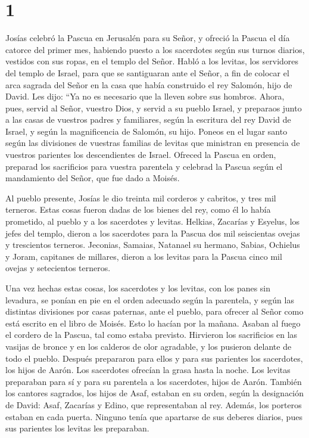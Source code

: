\hypertarget{section}{%
\section{1}\label{section}}

 Josías celebró la Pascua en Jerusalén para su Señor, y
ofreció la Pascua el día catorce del primer mes,  habiendo
puesto a los sacerdotes según sus turnos diarios, vestidos con sus
ropas, en el templo del Señor.  Habló a los levitas, los
servidores del templo de Israel, para que se santiguaran ante el Señor,
a fin de colocar el arca sagrada del Señor en la casa que había
construido el rey Salomón, hijo de David.  Les dijo: ``Ya
no es necesario que la lleven sobre sus hombros. Ahora, pues, servid al
Señor, vuestro Dios, y servid a su pueblo Israel, y preparaos junto a
las casas de vuestros padres y familiares,  según la
escritura del rey David de Israel, y según la magnificencia de Salomón,
su hijo. Poneos en el lugar santo según las divisiones de vuestras
familias de levitas que ministran en presencia de vuestros parientes los
descendientes de Israel.  Ofreced la Pascua en orden,
preparad los sacrificios para vuestra parentela y celebrad la Pascua
según el mandamiento del Señor, que fue dado a Moisés.

 Al pueblo presente, Josías le dio treinta mil corderos y
cabritos, y tres mil terneros. Estas cosas fueron dadas de los bienes
del rey, como él lo había prometido, al pueblo y a los sacerdotes y
levitas.  Helkias, Zacarías y Esyelus, los jefes del
templo, dieron a los sacerdotes para la Pascua dos mil seiscientas
ovejas y trescientos terneros.  Jeconias, Samaias,
Natanael su hermano, Sabias, Ochielus y Joram, capitanes de millares,
dieron a los levitas para la Pascua cinco mil ovejas y setecientos
terneros.

 Una vez hechas estas cosas, los sacerdotes y los
levitas, con los panes sin levadura, se ponían en pie en el orden
adecuado según la parentela,  y según las distintas
divisiones por casas paternas, ante el pueblo, para ofrecer al Señor
como está escrito en el libro de Moisés. Esto lo hacían por la mañana.
 Asaban al fuego el cordero de la Pascua, tal como estaba
previsto. Hirvieron los sacrificios en las vasijas de bronce y en los
calderos de olor agradable,  y los pusieron delante de
todo el pueblo. Después prepararon para ellos y para sus parientes los
sacerdotes, los hijos de Aarón.  Los sacerdotes ofrecían
la grasa hasta la noche. Los levitas preparaban para sí y para su
parentela a los sacerdotes, hijos de Aarón.  También los
cantores sagrados, los hijos de Asaf, estaban en su orden, según la
designación de David: Asaf, Zacarías y Edino, que representaban al rey.
 Además, los porteros estaban en cada puerta. Ninguno
tenía que apartarse de sus deberes diarios, pues sus parientes los
levitas les preparaban.


